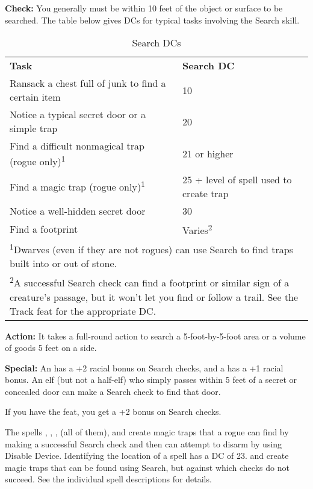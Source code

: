 
\textbf{Check:} You generally must be within 10 feet of the object or surface to 
be searched. The table below gives DCs for typical tasks involving the Search skill.

\begin{table}[htb]
\caption{Search DCs}
\centering
\begin{tabular}{l l}
\textbf{Task} & \textbf{Search DC}\\
Ransack a chest full of junk to find a certain item & 10\\
Notice a typical secret door or a simple trap & 20\\
Find a difficult nonmagical trap (rogue only)\textsuperscript{1} & 21 or higher\\
Find a magic trap (rogue only)\textsuperscript{1} & 25 + level of spell used to create trap\\
Notice a well-hidden secret door & 30\\
Find a footprint & Varies\textsuperscript{2}\\
\multicolumn{2}{l}{\textsuperscript{1}Dwarves (even if they are not rogues) can use Search to find traps built into or out of stone.}\\
\multicolumn{2}{p{14cm}}{\textsuperscript{2}A successful Search check can find a footprint or similar sign of a creature's passage, but it won't let you find or follow a trail. See the Track feat for the appropriate DC.}\\
\end{tabular}
\end{table}

\textbf{Action:} It takes a full-round action to search a 5-foot-by-5-foot area 
or a volume of goods 5 feet on a side.

\textbf{Special:} An  has a +2 racial bonus on Search checks, and a  
has a +1 racial bonus. An elf (but not a half-elf) who simply passes within 5 feet 
of a secret or concealed door can make a Search check to find that door.

If you have the  feat, you get a +2 bonus on Search checks.

The spells , , ,  (all of them), and  create magic traps that a rogue can find by making a successful Search 
check and then can attempt to disarm by using Disable Device. Identifying the location 
of a  spell has a DC of 23.  and  create magic traps that can be found using Search, but against which  checks do not succeed. See the individual spell descriptions for details.

